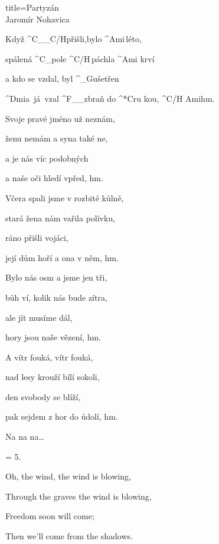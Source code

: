 \begin{song}{title=\predtitle\centering Partyzán  \\\large Jaromír Nohavica  \vspace*{-0.3cm}}  %
\begin{centerjustified}

\sloka 
	Když ^{C{\color{white}\_\_}C/H}přišli,\:bylo ^{Ami\,}léto,

	spálená ^{C{\color{white}\_}}pole ^{C/H{\color{white}\,\:}}páchla ^{Ami\,\,}krví

	a kdo se vzdal, byl ^{{\color{white}\_}G}ušetřen

	^{Dmi\z}a~já~vzal ^{F{\color{white}\_\_}}zbraň do ^*{C}ru kou, ^{C/H Ami}hm.\:\:\:\:\:\:\:\:\:\:\:\:

\sloka
	Svoje pravé jméno už neznám,
	
	ženu nemám a syna také ne,
	
	a je nás víc podobných
	
	a naše oči hledí vpřed, hm.

\sloka
	Včera spali jsme v rozbité kůlně,
	
	 stará žena nám vařila polívku,
	
	ráno přišli vojáci,
	
	její dům hoří a ona v něm, hm.

\sloka
	Bylo nás osm a jsme jen tři,
	
	bůh ví, kolik nás bude zítra,
	
	ale jít musíme dál,
	
	hory jsou naše vězení, hm.
	
\sloka
	A vítr fouká, vítr fouká,
	
	nad lesy krouží bílí sokoli,
	
	den svobody se blíží,
	
	pak sejdem z hor do údolí, hm.

\sloka
Na na na\elipsa\dots

\sloka = 5. 

\phantom{.}

Oh, the wind, the wind is blowing,

Through the graves the wind is blowing,

Freedom soon will come;

Then we'll come from the shadows.

\end{centerjustified}
\setcounter{Slokočet}{0}
\end{song}
